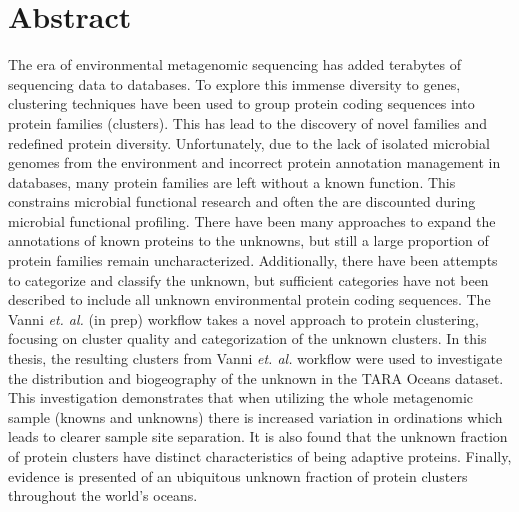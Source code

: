 \newpage
\chapter{Abstract}
\chaptermark{}
\renewcommand{\chaptermark}[1]{\markboth{#1}{}}
\renewcommand{\sectionmark}[1]{\markright{#1}}
\fancyhead[RE]{\small}
\fancyhead[LO]{\small\rightmark}%

The era of environmental metagenomic sequencing has added terabytes of sequencing data to databases. To explore this immense diversity to genes, clustering techniques have been used to group protein coding sequences into protein families (clusters). This has lead to the discovery of novel families and redefined protein diversity. Unfortunately, due to the lack of isolated microbial genomes from the environment and incorrect protein annotation management in databases, many protein families are left without a known function. This constrains microbial functional research and often the  are discounted during microbial functional profiling. There have been many approaches to expand the annotations of known proteins to the unknowns, but still a large proportion of protein families remain uncharacterized. Additionally, there have been attempts to categorize and classify the unknown, but sufficient categories have not been described to include all unknown environmental protein coding sequences. The Vanni \textit{et. al.} (in prep) workflow takes a novel approach to protein clustering, focusing on cluster quality and categorization of the unknown clusters. In this thesis, the resulting clusters from Vanni \textit{et. al.} workflow were used to investigate the distribution and biogeography of the unknown in the TARA Oceans dataset. This investigation demonstrates that when utilizing the whole metagenomic sample (knowns and unknowns) there is increased variation in ordinations which leads to clearer sample site separation. It is also found that the unknown fraction of protein clusters have distinct characteristics of being adaptive proteins. Finally, evidence is presented of an ubiquitous unknown fraction of protein clusters throughout the world's oceans.